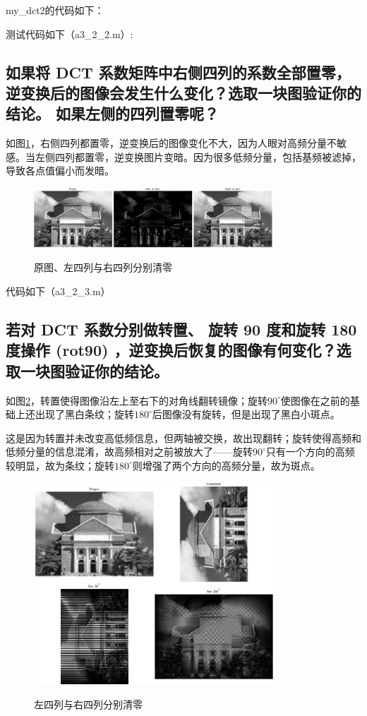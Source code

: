 \documentclass{ctexart}
\begin{document}
my\_dct2的代码如下：


测试代码如下（a3\_2\_2.m）:


\subsection{
如果将 DCT 系数矩阵中右侧四列的系数全部置零，逆变换后的图像会发生什么变化？选取一块图验证你的结论。 如果左侧的四列置零呢？
}
如图\ref{a323}，右侧四列都置零，逆变换后的图像变化不大，因为人眼对高频分量不敏感。当左侧四列都置零，逆变换图片变暗。因为很多低频分量，包括基频被滤掉，导致各点值偏小而发暗。
\begin{figure}
    \centering
    \includegraphics[width=0.8\textwidth]{pic/a3_2_3.jpg}\\
    \caption{原图、左四列与右四列分别清零\label{a323}}
\end{figure}

代码如下（a3\_2\_3.m）

\subsection{
若对 DCT 系数分别做转置、 旋转 90 度和旋转 180 度操作 (rot90) ，逆变换后恢复的图像有何变化？选取一块图验证你的结论。}
如图\ref{a324}，转置使得图像沿左上至右下的对角线翻转镜像；旋转$90^{\circ}$使图像在之前的基础上还出现了黑白条纹；旋转$180^{\circ}$后图像没有旋转，但是出现了黑白小斑点。

这是因为转置并未改变高低频信息，但两轴被交换，故出现翻转；旋转使得高频和低频分量的信息混淆，故高频相对之前被放大了——旋转$90^{\circ}$只有一个方向的高频较明显，故为条纹；旋转$180^{\circ}$则增强了两个方向的高频分量，故为斑点。
\begin{figure}
    \centering
    \includegraphics[width=0.8\textwidth]{pic/a3_2_4.jpg}\\
    \caption{左四列与右四列分别清零\label{a324}}
\end{figure}
\end{document}
